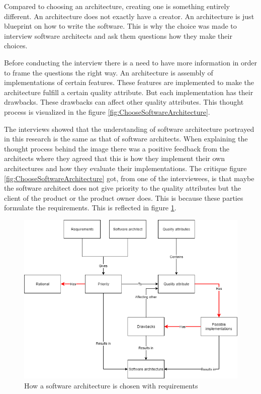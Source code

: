 Compared to choosing an architecture, creating one is something entirely different. An architecture does not exactly have a creator. An architecture is just blueprint on how to write the software. This is why the choice was made to interview software architects and ask them questions how they make their choices.

Before conducting the interview there is a need to have more information in order to frame the questions the right way. An architecture is assembly of implementations of certain features. These features are implemented to make the architecture fulfill a certain quality attribute. But each implementation has their drawbacks. These drawbacks can affect other quality attributes. This thought process is visualized in the figure \ref{fig:ChooseSoftwareArchitecture}.

The interviews showed that the understanding of software architecture portrayed in this research is the same as that of software architects. When explaining the thought process behind the image there was a positive feedback from the architects where they agreed that this is how they implement their own architectures and how they evaluate their implementations. The critique figure \ref{fig:ChooseSoftwareArchitecture} got, from one of the interviewees, is that maybe the software architect does not give priority to the quality attributes but the client of the product or the product owner does. This is because these parties formulate the requirements. This is reflected in figure \ref{fig:ChooseSoftwareArchitectureWReq}.

\begin{figure}[H]
	\includegraphics[width=\linewidth]{creating_architecture_requirements.png}
	\caption{How a software architecture is chosen with requirements}
        \label{fig:ChooseSoftwareArchitectureWReq}
\end{figure}
